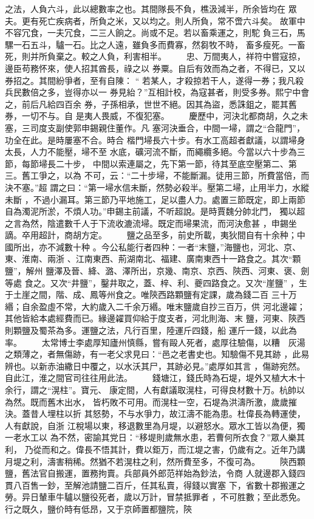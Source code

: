 \documentclass{ctexart}
\begin{document}
之法，人負六斗，此以總數率之也。其間隊長不負，樵汲減半，所余皆均在 眾夫。更有死亡疾病者，所負之米，又以均之。則人所負，常不啻六斗矣。 故軍中不容冗食，一夫冗食，二三人餉之。尚或不足。若以畜乘運之，則駝 負三石，馬騾一石五斗，驢一石。比之人遠，雖負多而費寡，然芻牧不時， 畜多瘦死。一畜死，則并所負棄之。較之人負，利害相半。 　　忠、万間夷人，祥符中嘗寇掠，邊臣苟務怀來，使人招其酋長，祿之以 券粟。自后有效而為之者，不得已，又以券招之。其間紛爭者，至有自陳： `` 若某人，才殺掠若干人，遂得一券；我凡殺兵民數倍之多，豈得亦以一 券見紿？''互相計校，為寇甚者，則受多券。熙宁中會之，前后凡給四百余 券，子孫相承，世世不絕。因其為盜，悉誅鉏之，罷其舊券，一切不与。自 是夷人畏威，不復犯塞。 　　慶歷中，河決北都商胡，久之未塞，三司度支副使郭申錫親住董作。凡 塞河決垂合，中間一埽，謂之``合龍門''，功全在此。是時屢塞不合。時合 楷門埽長六十步。有水工高超者獻議，以謂埽身太長，人力不能壓，埽不至 水底，礦河流不斷，而繩纜多絕。今當以六十步為三節，每節埽長二十步， 中間以索連屬之，先下第一節，待其至底空壓第二、第三。舊工爭之，以為 不可，云：``二十步埽，不能斷漏。徒用三節，所費當倍，而決不塞。''超 謂之曰：``第一埽水信未斷，然勢必殺半。壓第二埽，止用半力，水縱未斷 ，不過小漏耳。第三節乃平地施工，足以盡人力。處置三節既定，即上兩節 自為濁泥所淤，不煩人功。''申錫主前議，不听超說。是時賈魏分帥北門， 獨以超之言為然，陰遣數千人于下流收漉流埽。既定而埽果流，而河決愈甚 ，申錫坐謫。卒用超計，商胡方定。 　　鹽之品至多，前史所載，夷狄間自有十余种；中國所出，亦不減數十种 。今公私能行者四种：一者``末鹽，''海鹽也，河北、京、東、淮南、兩浙 、江南東西、荊湖南北、福建、廣南東西十一路食之。其次``顆鹽''，解州 鹽澤及晉、絳、潞、澤所出，京幾、南京、京西、陝西、河東、褒、劍等處 食之。又次``井鹽''，鑿井取之，蓋、梓、利、夔四路食之。又次``崖鹽'' ，生于土崖之間，階、成、鳳等州食之。唯陝西路顆鹽有定課，歲為錢二百 三十万緡；自余盈虛不常，大約歲入二千余万緡。唯末鹽歲自抄三百万，供 河北邊糴；其他皆給本處經費而已。緣邊糴買仰給于度支者，河北則海、末 鹽，河東、陝西則顆鹽及蜀茶為多。運鹽之法，凡行百里，陸運斤四錢，船 運斤一錢，以此為率。 　　太常博士李處厚知廬州慎縣，嘗有毆人死者，處厚往驗傷，以糟　灰湯 之類薄之，者無傷跡，有一老父求見曰：``邑之老書史也。知驗傷不見其跡 ，此易辨也。以新赤油繖日中覆之，以水沃其尸，其跡必見。''處厚如其言 ，傷跡宛然。自此江，淮之間官司往往用此法。 　　錢塘江，錢氏時為石堤，堤外又植大木十余行，謂之``滉柱''。寶元、 康定間，人有獻議取滉柱，可得良材數十万。杭帥以為然。既而舊木出水， 皆朽敗不可用。而滉柱一空，石堤為洪濤所激，歲歲摧決。蓋昔人埋柱以折 其怒勢，不与水爭力，故江濤不能為患。杜偉長為轉運使，人有獻說，自浙 江稅場以東，移退數里為月堤，以避怒水。眾水工皆以為便，獨一老水工以 為不然，密諭其党日：``移堤則歲無水患，若曹何所衣食？''眾人樂其利， 乃從而和之。偉長不悟其計，費以鉅万，而江堤之害，仍歲有之。近年乃講 月堤之利，濤害稍稀。然猶不若滉柱之利，然所費至多，不復可為。 　　陝西顆鹽，舊法官自搬運，置務拘賣。兵部員外郎范祥始為鈔法，令商 人就邊郡入錢四貫八百售一鈔，至解池請鹽二百斤，任其私賣，得錢以實塞 下，省數十郡搬運之勞。异日輦車牛驢以鹽役死者，歲以万計，冒禁抵罪者 ，不可胜數；至此悉免。行之既久，鹽价時有低昂，又于京師置都鹽院，陝 
\end{document}
